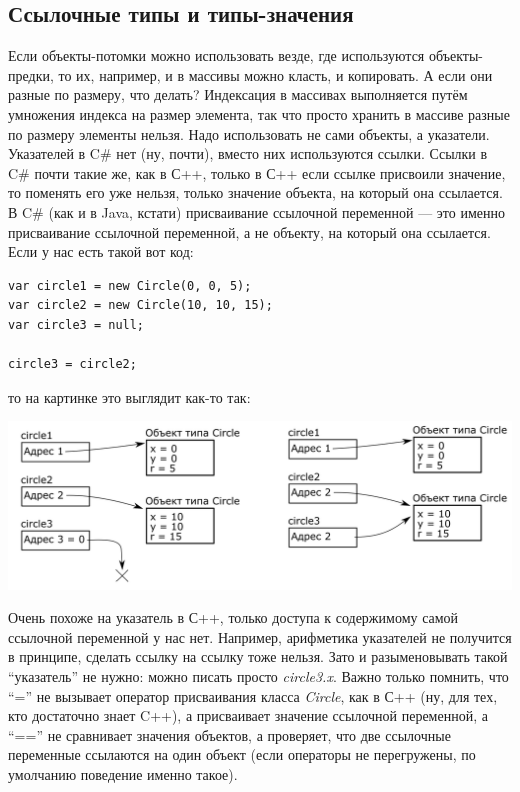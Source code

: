 \documentclass[a5paper]{article}
\begin{document}
\subsection{Ссылочные типы и типы-значения}

Если объекты-потомки можно использовать везде, где используются объекты-предки, то их, например, и в массивы можно класть, и копировать. А если они разные по размеру, что делать? Индексация в массивах выполняется путём умножения индекса на размер элемента, так что просто хранить в массиве разные по размеру элементы нельзя. Надо использовать не сами объекты, а указатели. Указателей в C\# нет (ну, почти), вместо них используются ссылки. Ссылки в C\# почти такие же, как в С++, только в С++ если ссылке присвоили значение, то поменять его уже нельзя, только значение объекта, на который она ссылается. В C\# (как и в Java, кстати) присваивание ссылочной переменной --- это именно присваивание ссылочной переменной, а не объекту, на который она ссылается. Если у нас есть такой вот код:

\begin{verbatim}
var circle1 = new Circle(0, 0, 5);
var circle2 = new Circle(10, 10, 15);
var circle3 = null;

circle3 = circle2;
\end{verbatim}

то на картинке это выглядит как-то так:

\begin{center}
	\includegraphics[width=\textwidth]{referenceTypes.png}
\end{center}

Очень похоже на указатель в С++, только доступа к содержимому самой ссылочной переменной у нас нет. Например, арифметика указателей не получится в принципе, сделать ссылку на ссылку тоже нельзя. Зато и разыменовывать такой ``указатель'' не нужно: можно писать просто \textit{circle3.x}. Важно только помнить, что ``='' не вызывает оператор присваивания класса \textit{Circle}, как в С++ (ну, для тех, кто достаточно знает C++), а присваивает значение ссылочной переменной, а ``=='' не сравнивает значения объектов, а проверяет, что две ссылочные переменные ссылаются на один объект (если операторы не перегружены, по умолчанию поведение именно такое).
\end{document}
